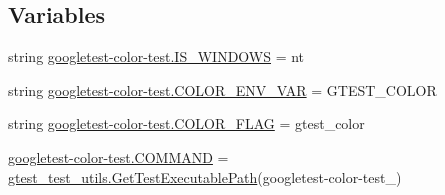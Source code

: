 \subsection*{Variables}
\begin{DoxyCompactItemize}
\item 
string \mbox{\hyperlink{namespacegoogletest-color-test_a07f0b97c52cab5ae5a6b1ad70a76166e}{googletest-\/color-\/test.\+I\+S\+\_\+\+W\+I\+N\+D\+O\+WS}} = \textquotesingle{}nt\textquotesingle{}
\item 
string \mbox{\hyperlink{namespacegoogletest-color-test_a4ac2cb718d08e0e67fbdd90235860607}{googletest-\/color-\/test.\+C\+O\+L\+O\+R\+\_\+\+E\+N\+V\+\_\+\+V\+AR}} = \textquotesingle{}G\+T\+E\+S\+T\+\_\+\+C\+O\+L\+OR\textquotesingle{}
\item 
string \mbox{\hyperlink{namespacegoogletest-color-test_ab0f3fdc147b4742a8c797dfa37de9b96}{googletest-\/color-\/test.\+C\+O\+L\+O\+R\+\_\+\+F\+L\+AG}} = \textquotesingle{}gtest\+\_\+color\textquotesingle{}
\item 
\mbox{\hyperlink{namespacegoogletest-color-test_a4095c8c816acd62b69a8740dcea2bf52}{googletest-\/color-\/test.\+C\+O\+M\+M\+A\+ND}} = \mbox{\hyperlink{namespacegtest__test__utils_a89ed3717984a80ffbb7a9c92f71b86a2}{gtest\+\_\+test\+\_\+utils.\+Get\+Test\+Executable\+Path}}(\textquotesingle{}googletest-\/color-\/test\+\_\+\textquotesingle{})
\end{DoxyCompactItemize}
